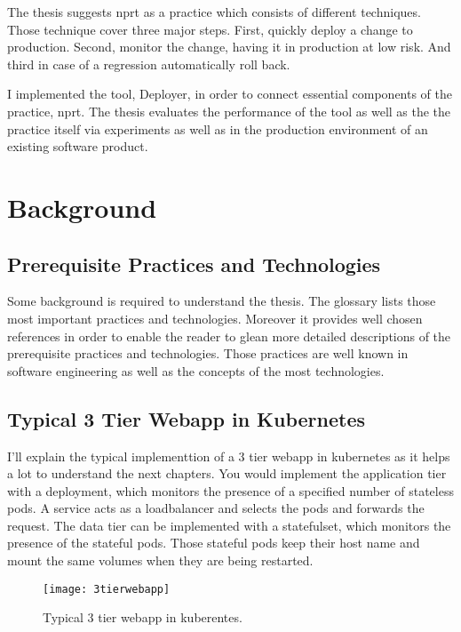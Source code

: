 The thesis suggests \gls{nprt} as a practice which consists of different techniques. Those
technique cover three major steps. First, quickly deploy a change to production. Second,
monitor the change, having it in production at low risk. And third in case of a regression
automatically roll back.

I implemented the tool, Deployer, in order to connect essential components of the
practice, \gls{nprt}. The thesis evaluates the performance of the tool as well as the the
practice itself via experiments as well as in the production environment of an existing
software product.

\chapter{Background}
\label{chap:background}

\section{Prerequisite Practices and Technologies}

Some background is required to understand the thesis. The glossary lists those most
important practices and technologies. Moreover it provides well chosen references in order
to enable the reader to glean more detailed descriptions of the prerequisite practices and
technologies. Those practices are well known in software engineering as well as the
concepts of the most technologies.

\section{Typical 3 Tier Webapp in Kubernetes}

I'll explain the typical implementtion of a 3 tier webapp in kubernetes as it helps a lot
to understand the next chapters. You would implement the application tier with a
deployment, which monitors the presence of a specified number of stateless pods. A service
acts as a loadbalancer and selects the pods and forwards the request. The data tier can be
implemented with a statefulset, which monitors the presence of the stateful pods. Those
stateful pods keep their host name and mount the same volumes when they are being
restarted.

\begin{figure}[htbp]
  \centering
  \texttt{[image: 3tierwebapp]}
  \caption[3tierwebapp]{Typical 3 tier webapp in kuberentes.}
  \label{fig:3tierwebapp}
\end{figure}

